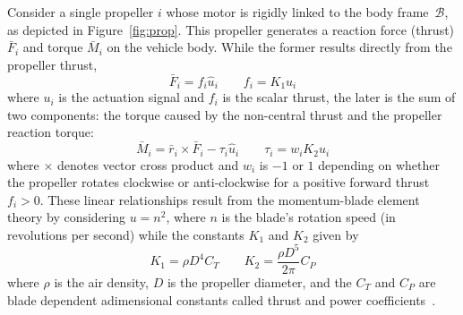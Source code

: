 


Consider a single propeller $i$ whose motor is rigidly linked to the
body frame~$\mathcal{B}$, as depicted in Figure~\ref{fig:prop}.  This
propeller  generates a reaction force (thrust) $\bar{F}_i$ and  torque
$\bar{M}_i$ on the vehicle body.
While the former results directly from the
propeller thrust,
\begin{equation}
  \label{eq:Fi}
  \bar{F}_i = f_i \hat{u}_i \qquad %
  f_i = K_1 u_i
\end{equation}
where $u_i$ is the actuation signal and $f_i$ is the scalar thrust,
the later is the sum of two components: the torque caused by the
non-central thrust
and the propeller reaction torque:
\begin{equation}
  \label{eq:Mi}
  \bar{M}_i = \bar{r}_i\times\bar{F}_i - \tau_i \hat{u}_i \qquad
  \tau_i = w_i K_2 u_i
\end{equation}
where $\times$ denotes vector cross product and $w_i$ is $-1$ or $1$
depending on whether the propeller rotates clockwise or anti-clockwise
for a positive forward thrust $f_i>0$.  These linear relationships
result from the momentum-blade element theory by considering $u=n^2$,
where $n$ is the blade's rotation speed (in revolutions per second) while the
constants $K_1$ and $K_2$ given by
\begin{equation}
  \label{eq:blade}
  K_1 = \rho D^4 C_T \qquad K_2 = \frac{\rho D^5}{2\pi} C_P
\end{equation}
where $\rho$ is the air density, $D$ is the propeller diameter, and
the $C_T$ and $C_P$ are blade dependent adimensional constants called
thrust and power coefficients~\cite{mccormick95}.


